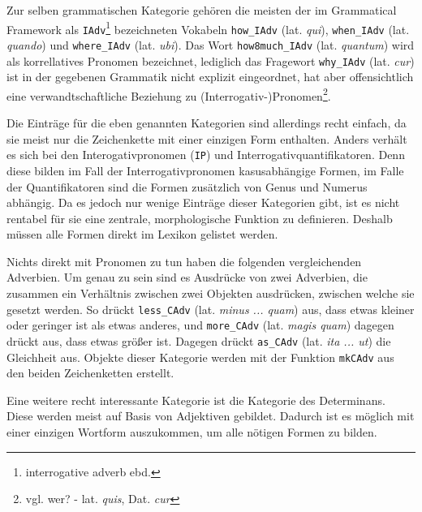 \documentclass[fontsize=12pt,abstract=on,titlepage,bibliography=totoc,ngerman,listof=totoc]{scrreprt}
\begin{document}
Zur selben grammatischen Kategorie gehören die meisten der im Grammatical Framework als \texttt{IAdv}\footnote{interrogative adverb ebd.} bezeichneten Vokabeln \texttt{how\_IAdv} (lat. \textit{qui}), \texttt{when\_IAdv} (lat. \textit{quando}) und \texttt{where\_IAdv} (lat. \textit{ubi}). Das Wort \texttt{how8much\_IAdv} (lat. \textit{quantum}) wird als korrellatives Pronomen bezeichnet, lediglich das Fragewort \texttt{why\_IAdv} (lat. \textit{cur}) ist in der gegebenen Grammatik nicht explizit eingeordnet, hat aber offensichtlich eine verwandtschaftliche Beziehung zu (Interrogativ-)Pronomen\footnote {vgl. wer? -  lat. \textit{quis}, Dat. \textit{cur}}. \par
Die Einträge für die eben genannten Kategorien sind allerdings recht einfach, da sie meist nur die Zeichenkette mit einer einzigen Form enthalten. Anders verhält es sich bei den Interogativpronomen (\texttt{IP}) und Interrogativquantifikatoren. Denn diese bilden im Fall der Interrogativpronomen kasusabhängige Formen, im Falle der Quantifikatoren sind die Formen zusätzlich von Genus und Numerus abhängig. Da es jedoch nur wenige Einträge dieser Kategorien gibt, ist es nicht rentabel für sie eine zentrale, morphologische Funktion zu definieren. Deshalb müssen alle Formen direkt im Lexikon gelistet werden. \par
Nichts direkt mit Pronomen zu tun haben die folgenden vergleichenden Adverbien. Um genau zu sein sind es Ausdrücke von zwei Adverbien, die zusammen ein Verhältnis zwischen zwei Objekten ausdrücken, zwischen welche sie gesetzt werden. So drückt \texttt{less\_CAdv} (lat. \textit{minus ... quam}) aus, dass etwas kleiner oder geringer ist als etwas anderes, und \texttt{more\_CAdv} (lat. \textit{magis quam}) dagegen drückt aus, dass etwas größer ist. Dagegen drückt \texttt{as\_CAdv} (lat. \textit{ita ... ut}) die Gleichheit aus. Objekte dieser Kategorie werden mit der Funktion \texttt{mkCAdv} aus den beiden Zeichenketten erstellt. \par
Eine weitere recht interessante Kategorie ist die Kategorie des Determinans. Diese werden meist auf Basis von Adjektiven gebildet. Dadurch ist es möglich mit einer einzigen Wortform auszukommen, um alle nötigen Formen zu bilden. \par
\end{document}
